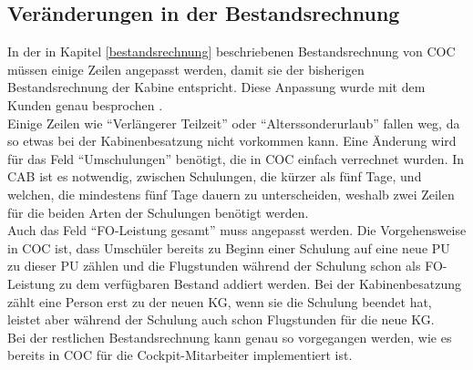 \documentclass [12pt, a4paper, oneside, titlepage, ngerman]{article}
\begin{document}
\subsection{Veränderungen in der Bestandsrechnung}
In der in Kapitel \ref{bestandsrechnung} beschriebenen Bestandsrechnung von \ac{COC} müssen einige Zeilen angepasst werden, damit sie der bisherigen Bestandsrechnung der Kabine entspricht. Diese Anpassung wurde mit dem Kunden genau besprochen \cite[vgl.][]{bestanddet}. \\
Einige Zeilen wie "`Verlängerer Teilzeit"' oder "`Alterssonderurlaub"' fallen weg, da so etwas bei der Kabinenbesatzung nicht vorkommen kann. Eine Änderung wird für das Feld "`Umschulungen"' benötigt, die in \ac{COC} einfach verrechnet wurden. In \ac{CAB} ist es notwendig, zwischen Schulungen, die kürzer als fünf Tage, und welchen, die mindestens fünf Tage dauern zu unterscheiden, weshalb zwei Zeilen für die beiden Arten der Schulungen benötigt werden. \\ %
Auch das Feld "`FO-Leistung gesamt"' muss angepasst werden. Die Vorgehensweise in \ac{COC} ist, dass Umschüler bereits zu Beginn einer Schulung auf eine neue \ac{PU} zu dieser \ac{PU} zählen und die Flugstunden während der Schulung schon als FO-Leistung zu dem verfügbaren Bestand addiert werden. Bei der Kabinenbesatzung zählt eine Person erst zu der neuen \ac{KG}, wenn sie die Schulung beendet hat, leistet aber während der Schulung auch schon Flugstunden für die neue \ac{KG}. \\%
Bei der restlichen Bestandsrechnung kann genau so vorgegangen werden, wie es bereits in \ac{COC} für die Cockpit-Mitarbeiter implementiert ist.

\end{document}
